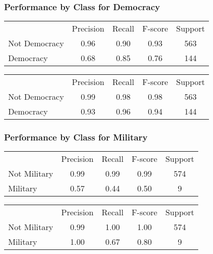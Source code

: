 \documentclass{beamer}
\begin{document}
\begin{frame}
\frametitle{Performance by Class for Democracy}

\begin{table}[ht]
\centering
\begin{tabular}{lcccc}
\hline\hline
~& Precision & Recall & F-score & Support \\
Not Democracy & 0.96 & 0.90 & 0.93 & 563 \\
Democracy & 0.68 & 0.85 & 0.76 & 144
\end{tabular}
\end{table}

\begin{table}[ht]
\centering
\begin{tabular}{lcccc}
\hline\hline
~& Precision & Recall & F-score & Support \\
Not Democracy & 0.99 & 0.98 & 0.98 & 563 \\
Democracy & 0.93 & 0.96 & 0.94 & 144
\end{tabular}
\end{table}

\end{frame}

\begin{frame}
\frametitle{Performance by Class for Military}

\begin{table}[ht]
\centering
\begin{tabular}{lcccc}
\hline\hline
~& Precision & Recall & F-score & Support \\
Not Military & 0.99 & 0.99 & 0.99 & 574 \\
Military & 0.57 & 0.44 & 0.50 & 9
\end{tabular}
\end{table}

\begin{table}[ht]
\centering
\begin{tabular}{lcccc}
\hline\hline
~& Precision & Recall & F-score & Support \\
Not Military & 0.99 & 1.00 & 1.00 & 574 \\
Military & 1.00 & 0.67 & 0.80 & 9
\end{tabular}
\end{table}

\end{frame}
\end{document}
